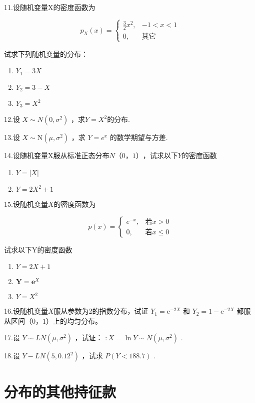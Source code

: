 11.设随机变量X的密度函数为

\[
p_{X}(x)=\left\{
\begin{array}{ll}
{\frac{3}{2} x^{2},} & {-1<x<1} \\ 
{0,} & {\text{其它}}
\end{array}\right.
\]

试求下列随机变量的分布：

\begin{enumerate}
	\item $Y_{1}=3 X$
	\item $Y_{2}=3-X$
	\item $Y_{3}=X^{2}$
\end{enumerate}

12.设 $X \sim N\left(0, \sigma^{2}\right)$ ，求$ Y=X^{2} $的分布.

13.设 $X \sim \mathrm{N}\left(\mu, \sigma^{2}\right)$ ，求 $Y=e^{x}$ 的数学期望与方差.

14.设随机变量X服从标准正态分布$ N（0，1） $，试求以下$ Y $的密度函数

\begin{enumerate}
	\item $Y=|X|$
	\item $Y=2 X^{2}+1$
\end{enumerate}

15.设随机变量$ X $的密度函数为

\[
p(x)=\left\{
\begin{array}{ll}
{e^{-x},} & {\text{若} x>0} \\ 
{0,} & {\text{若} x \leqslant 0}
\end{array}\right.
\]

试求以下Y的密度函数
\begin{enumerate}
	\item $Y=2 X+1$
	\item $\mathbf{Y}=\mathbf{e}^{X}$
	\item $Y=X^{2}$
\end{enumerate}

16.设随机变量$ X $服从参数为2的指数分布，试证 $Y_{1}=\mathrm{e}^{-2 X}$ 和 $Y_{2}=1-\mathrm{e}^{-2 X}$ 都服从区间$ （0，1） $上的均匀分布。

17.设 $Y \sim L N\left(\mu, \sigma^{2}\right)$ ，试证： $: X=\ln Y \sim N\left(\mu, \sigma^{2}\right)$ .

18.设 $Y-L N\left(5,0.12^{2}\right)$ ，试求 $P(Y<188.7)$ .

\section{分布的其他持征款}

